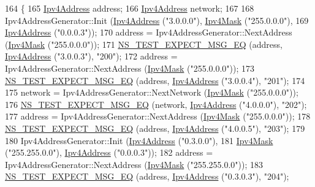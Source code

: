 \begin{DoxyCode}
164 \{
165   \hyperlink{classns3_1_1Ipv4Address}{Ipv4Address} address;
166   \hyperlink{classns3_1_1Ipv4Address}{Ipv4Address} network;
167 
168   Ipv4AddressGenerator::Init (\hyperlink{classns3_1_1Ipv4Address}{Ipv4Address} (\textcolor{stringliteral}{"3.0.0.0"}), \hyperlink{classns3_1_1Ipv4Mask}{Ipv4Mask} (\textcolor{stringliteral}{"255.0.0.0"}),
169                               \hyperlink{classns3_1_1Ipv4Address}{Ipv4Address} (\textcolor{stringliteral}{"0.0.0.3"}));
170   address = Ipv4AddressGenerator::NextAddress (\hyperlink{classns3_1_1Ipv4Mask}{Ipv4Mask} (\textcolor{stringliteral}{"255.0.0.0"}));
171   \hyperlink{group__testing_ga7304ba46a28d8cf08dfdfd6499cf7068}{NS\_TEST\_EXPECT\_MSG\_EQ} (address, \hyperlink{classns3_1_1Ipv4Address}{Ipv4Address} (\textcolor{stringliteral}{"3.0.0.3"}), \textcolor{stringliteral}{"200"});
172   address = Ipv4AddressGenerator::NextAddress (\hyperlink{classns3_1_1Ipv4Mask}{Ipv4Mask} (\textcolor{stringliteral}{"255.0.0.0"}));
173   \hyperlink{group__testing_ga7304ba46a28d8cf08dfdfd6499cf7068}{NS\_TEST\_EXPECT\_MSG\_EQ} (address, \hyperlink{classns3_1_1Ipv4Address}{Ipv4Address} (\textcolor{stringliteral}{"3.0.0.4"}), \textcolor{stringliteral}{"201"});
174 
175   network = Ipv4AddressGenerator::NextNetwork (\hyperlink{classns3_1_1Ipv4Mask}{Ipv4Mask} (\textcolor{stringliteral}{"255.0.0.0"}));
176   \hyperlink{group__testing_ga7304ba46a28d8cf08dfdfd6499cf7068}{NS\_TEST\_EXPECT\_MSG\_EQ} (network, \hyperlink{classns3_1_1Ipv4Address}{Ipv4Address} (\textcolor{stringliteral}{"4.0.0.0"}), \textcolor{stringliteral}{"202"});
177   address = Ipv4AddressGenerator::NextAddress (\hyperlink{classns3_1_1Ipv4Mask}{Ipv4Mask} (\textcolor{stringliteral}{"255.0.0.0"}));
178   \hyperlink{group__testing_ga7304ba46a28d8cf08dfdfd6499cf7068}{NS\_TEST\_EXPECT\_MSG\_EQ} (address, \hyperlink{classns3_1_1Ipv4Address}{Ipv4Address} (\textcolor{stringliteral}{"4.0.0.5"}), \textcolor{stringliteral}{"203"});
179 
180   Ipv4AddressGenerator::Init (\hyperlink{classns3_1_1Ipv4Address}{Ipv4Address} (\textcolor{stringliteral}{"0.3.0.0"}), 
181                               \hyperlink{classns3_1_1Ipv4Mask}{Ipv4Mask} (\textcolor{stringliteral}{"255.255.0.0"}), \hyperlink{classns3_1_1Ipv4Address}{Ipv4Address} (\textcolor{stringliteral}{"0.0.0.3"}));
182   address = Ipv4AddressGenerator::NextAddress (\hyperlink{classns3_1_1Ipv4Mask}{Ipv4Mask} (\textcolor{stringliteral}{"255.255.0.0"}));
183   \hyperlink{group__testing_ga7304ba46a28d8cf08dfdfd6499cf7068}{NS\_TEST\_EXPECT\_MSG\_EQ} (address, \hyperlink{classns3_1_1Ipv4Address}{Ipv4Address} (\textcolor{stringliteral}{"0.3.0.3"}), \textcolor{stringliteral}{"204"});

\end{DoxyCode}
